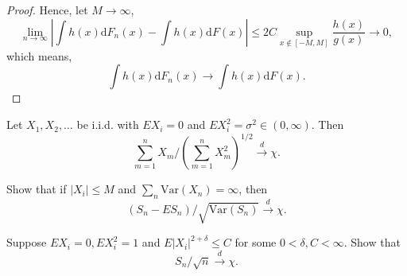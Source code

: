 \begin{proof}
    Hence, let $M\rightarrow\infty$,
    \begin{equation*}
        \lim_{n\rightarrow\infty}\left|\int h(x)\mathrm{d}F_{n}(x)-\int h(x)\mathrm{d}F(x)\right| \leq 2C\sup_{x\notin[-M,M]}\frac{h(x)}{g(x)}\rightarrow 0,
    \end{equation*}
    which means,
    \begin{equation*}
        \int h(x)\mathrm{d}F_{n}(x) \rightarrow \int h(x)\mathrm{d}F(x).
    \end{equation*}
\end{proof}

\begin{exercise}
    Let $X_{1},X_{2},\ldots$ be i.i.d. with $EX_{i}=0$ and $EX_{i}^{2}=\sigma^{2}\in(0,\infty)$. Then
    \begin{equation*}
        \sum_{m=1}^{n}X_{m}/\left(\sum_{m=1}^{n}X_{m}^{2}\right)^{1/2}\stackrel{d}{\rightarrow}\chi.
    \end{equation*}
\end{exercise}

\begin{exercise}
    Show that if $\left|X_{i}\right|\leq M$ and $\sum_{n}\text{Var}\left(X_{n}\right)=\infty$, then
    \begin{equation*}
        \left(S_{n}-E S_{n}\right)/\sqrt{\text{Var}\left(S_{n}\right)}\stackrel{d}{\rightarrow}\chi.
    \end{equation*}
\end{exercise}

\begin{exercise}
    Suppose $EX_{i}=0,EX_{i}^{2}=1$ and $E\left|X_{i}\right|^{2+\delta}\leq C$ for some $0<\delta,C<\infty$. Show that
    \begin{equation*}
        S_{n}/\sqrt{n}\stackrel{d}{\rightarrow}\chi.
    \end{equation*}
\end{exercise}